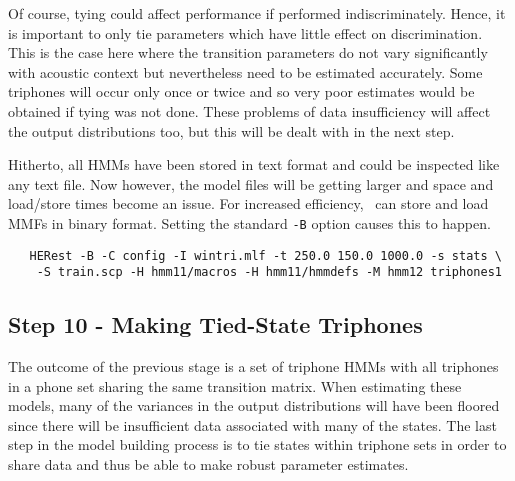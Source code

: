 Of course, tying could affect performance if performed indiscriminately.
Hence, it is important to only tie parameters which have little effect on
discrimination.  This is the case here where the transition parameters do not
vary significantly with acoustic context but nevertheless need to be estimated
accurately.  Some triphones will occur only once or twice and so very poor
estimates would be obtained if tying was not done.  These problems of data
insufficiency will affect the output distributions too, but this will be dealt
with in the next step.

Hitherto, all HMMs have been stored in text format and could be inspected like
any text file.  Now however, the model files will be getting larger and space
and load/store times become an issue.  For increased efficiency,
\HTK\ can store and load MMFs in binary
format.  Setting the standard \texttt{-B} option causes this to happen.

\begin{verbatim}
   HERest -B -C config -I wintri.mlf -t 250.0 150.0 1000.0 -s stats \
    -S train.scp -H hmm11/macros -H hmm11/hmmdefs -M hmm12 triphones1
\end{verbatim}


\subsection{Step 10 - Making Tied-State Triphones}

The outcome of the previous stage is a set of triphone HMMs with all triphones
in a phone set sharing the same transition matrix.  When estimating these
models, many of the variances in the output distributions
will have been floored since there will be
\index{tying!states}\index{data insufficiency}
insufficient data associated with many of the states.  The last step in
the model building process is to tie states within triphone sets
in order to share data and thus be able to make robust parameter estimates.

